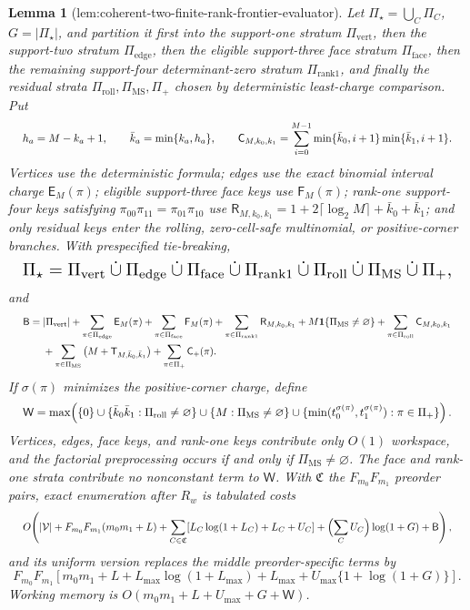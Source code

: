 \documentclass{article}
\newtheorem{lemma}{Lemma}
\begin{document}
\begin{lemma}[lem:coherent-two-finite-rank-frontier-evaluator]
Let \(\Pi_\star=\bigcup_C\Pi_C\), \(G=|\Pi_\star|\), and partition it first into the support-one stratum \(\Pi_{\mathrm{vert}}\), then the support-two stratum \(\Pi_{\mathrm{edge}}\), then the eligible support-three face stratum \(\Pi_{\mathrm{face}}\), then the remaining support-four determinant-zero stratum \(\Pi_{\mathrm{rank1}}\), and finally the residual strata \(\Pi_{\mathrm{roll}},\Pi_{\mathrm{MS}},\Pi_+\) chosen by deterministic least-charge comparison. Put
\[
\makebox[\linewidth][c]{\resizebox{0.98\linewidth}{!}{\(\displaystyle h_a=M-k_a+1,\qquad \bar k_a=\min\{k_a,h_a\},\qquad
\mathsf C_{M,k_0,k_1}=\sum_{i=0}^{M-1}
\min\{\bar k_0,i+1\}\min\{\bar k_1,i+1\}.\)}}
\]
Vertices use the deterministic formula; edges use the exact binomial interval charge \(\mathsf E_M(\pi)\); eligible support-three face keys use \(\mathsf F_M(\pi)\); rank-one support-four keys satisfying \(\pi_{00}\pi_{11}=\pi_{01}\pi_{10}\) use \(\mathsf R_{M,k_0,k_1}=1+2\lceil\log_2M\rceil+\bar k_0+\bar k_1\); and only residual keys enter the rolling, zero-cell-safe multinomial, or positive-corner branches. With prespecified tie-breaking,
\[
\makebox[\linewidth][c]{\resizebox{0.98\linewidth}{!}{\(\displaystyle \Pi_\star=\Pi_{\mathrm{vert}}\mathbin{\dot\cup}\Pi_{\mathrm{edge}}
\mathbin{\dot\cup}\Pi_{\mathrm{face}}\mathbin{\dot\cup}
\Pi_{\mathrm{rank1}}\mathbin{\dot\cup}
\Pi_{\mathrm{roll}}\mathbin{\dot\cup}
\Pi_{\mathrm{MS}}\mathbin{\dot\cup}\Pi_+,\)}}
\]
and
\[
\makebox[\linewidth][c]{\resizebox{0.98\linewidth}{!}{\(\displaystyle \begin{aligned}
\mathsf B={}&|\Pi_{\mathrm{vert}}|
+\sum_{\pi\in\Pi_{\mathrm{edge}}}\mathsf E_M(\pi)
+\sum_{\pi\in\Pi_{\mathrm{face}}}\mathsf F_M(\pi)
+\sum_{\pi\in\Pi_{\mathrm{rank1}}}\mathsf R_{M,k_0,k_1}
+M\mathbf 1\{\Pi_{\mathrm{MS}}\ne\varnothing\}
+\sum_{\pi\in\Pi_{\mathrm{roll}}}\mathsf C_{M,k_0,k_1}\\
&+\sum_{\pi\in\Pi_{\mathrm{MS}}}
\left(M+\mathsf T_{M,\bar k_0,\bar k_1}\right)
+\sum_{\pi\in\Pi_+}\mathsf C_+(\pi).
\end{aligned}\)}}
\]
If \(\sigma(\pi)\) minimizes the positive-corner charge, define
\[
\makebox[\linewidth][c]{\resizebox{0.98\linewidth}{!}{\(\displaystyle \mathsf W=\max\!\left(
\{0\}\cup\{\bar k_0\bar k_1:\Pi_{\mathrm{roll}}\ne\varnothing\}
\cup\{M:\Pi_{\mathrm{MS}}\ne\varnothing\}
\cup\{\min(t_0^{\sigma(\pi)},t_1^{\sigma(\pi)}):\pi\in\Pi_+\}
\right).\)}}
\]
Vertices, edges, face keys, and rank-one keys contribute only \(O(1)\) workspace, and the factorial preprocessing occurs if and only if \(\Pi_{\mathrm{MS}}\ne\varnothing\). The face and rank-one strata contribute no nonconstant term to \(\mathsf W\). With \(\mathfrak C\) the \(F_{m_0}F_{m_1}\) preorder pairs, exact enumeration after \(R_w\) is tabulated costs
\[
\makebox[\linewidth][c]{\resizebox{0.98\linewidth}{!}{\(\displaystyle O\!\left(
|\mathcal V|+F_{m_0}F_{m_1}(m_0m_1+L)
+\sum_{C\in\mathfrak C}[L_C\log(1+L_C)+L_C+U_C]
+\Bigl(\sum_CU_C\Bigr)\log(1+G)+\mathsf B
\right),\)}}
\]
and its uniform version replaces the middle preorder-specific terms by
\[
F_{m_0}F_{m_1}
[m_0m_1+L+L_{\max}\log(1+L_{\max})+L_{\max}
+U_{\max}\{1+\log(1+G)\}].
\]
Working memory is \(O(m_0m_1+L+U_{\max}+G+\mathsf W)\).


\end{lemma}
\end{document}

